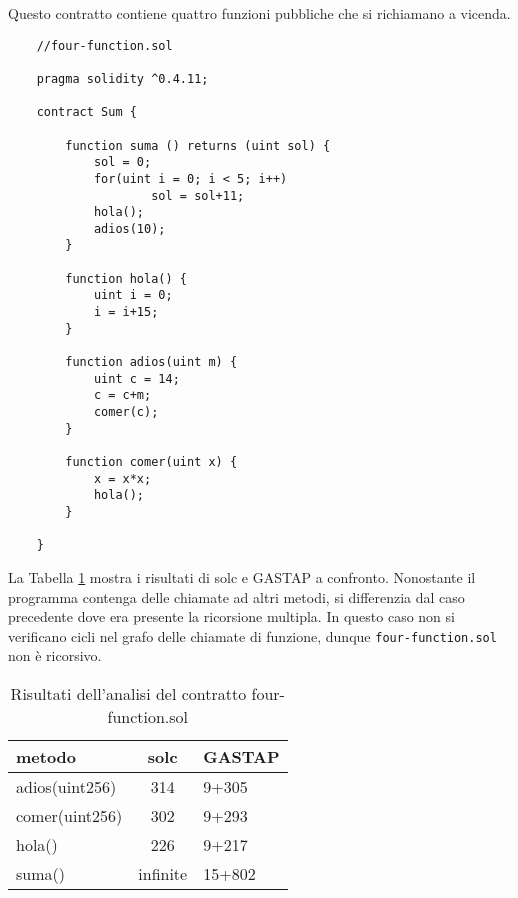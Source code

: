     Questo contratto contiene quattro funzioni pubbliche che si richiamano a vicenda. 
    
    \begin{minipage}{\linewidth}
    \begin{lstlisting}
    //four-function.sol

    pragma solidity ^0.4.11;

    contract Sum {

        function suma () returns (uint sol) {
            sol = 0;
            for(uint i = 0; i < 5; i++)
                    sol = sol+11;
            hola();
            adios(10);
        }

        function hola() {
            uint i = 0;
            i = i+15;
        }

        function adios(uint m) {
            uint c = 14;
            c = c+m;
            comer(c);   
        }

        function comer(uint x) {
            x = x*x;
            hola();
        }

    }
    \end{lstlisting}
    \end{minipage}
    
    La Tabella \ref{tab:four-function-outputs} mostra i risultati di solc e GASTAP a confronto. Nonostante il programma contenga delle chiamate ad altri metodi, si differenzia dal caso precedente dove era presente la ricorsione multipla. In questo caso non si verificano cicli nel grafo delle chiamate di funzione, dunque \verb|four-function.sol| non è ricorsivo.
    
    \begin{table}[h]
    \begin{center}
    \begin{tabular}{p{5cm}cp{6cm}}  
    \hline \hline
    \bf metodo & \bf solc & \bf GASTAP \\
    \hline
    adios(uint256) & 314 & 9+305\\
    comer(uint256) & 302 & 9+293\\
    hola() & 226 & 9+217\\
    suma() & infinite & 15+802\\
    \hline \hline
    \end{tabular}
    \caption[Analisi di four-function.sol]{Risultati dell'analisi del contratto four-function.sol}\label{tab:four-function-outputs}
    \end{center}
    \end{table}
    

